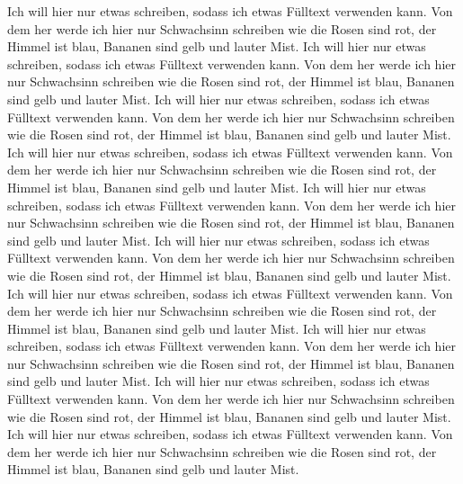 Ich will hier nur etwas schreiben, sodass ich etwas Fülltext verwenden kann. Von dem her werde ich hier nur Schwachsinn schreiben wie die Rosen sind rot, der Himmel ist blau, Bananen sind gelb und lauter Mist. Ich will hier nur etwas schreiben, sodass ich etwas Fülltext verwenden kann. Von dem her werde ich hier nur Schwachsinn schreiben wie die Rosen sind rot, der Himmel ist blau, Bananen sind gelb und lauter Mist. Ich will hier nur etwas schreiben, sodass ich etwas Fülltext verwenden kann. Von dem her werde ich hier nur Schwachsinn schreiben wie die Rosen sind rot, der Himmel ist blau, Bananen sind gelb und lauter Mist. Ich will hier nur etwas schreiben, sodass ich etwas Fülltext verwenden kann. Von dem her werde ich hier nur Schwachsinn schreiben wie die Rosen sind rot, der Himmel ist blau, Bananen sind gelb und lauter Mist. Ich will hier nur etwas schreiben, sodass ich etwas Fülltext verwenden kann. Von dem her werde ich hier nur Schwachsinn schreiben wie die Rosen sind rot, der Himmel ist blau, Bananen sind gelb und lauter Mist. Ich will hier nur etwas schreiben, sodass ich etwas Fülltext verwenden kann. Von dem her werde ich hier nur Schwachsinn schreiben wie die Rosen sind rot, der Himmel ist blau, Bananen sind gelb und lauter Mist. Ich will hier nur etwas schreiben, sodass ich etwas Fülltext verwenden kann. Von dem her werde ich hier nur Schwachsinn schreiben wie die Rosen sind rot, der Himmel ist blau, Bananen sind gelb und lauter Mist. Ich will hier nur etwas schreiben, sodass ich etwas Fülltext verwenden kann. Von dem her werde ich hier nur Schwachsinn schreiben wie die Rosen sind rot, der Himmel ist blau, Bananen sind gelb und lauter Mist. Ich will hier nur etwas schreiben, sodass ich etwas Fülltext verwenden kann. Von dem her werde ich hier nur Schwachsinn schreiben wie die Rosen sind rot, der Himmel ist blau, Bananen sind gelb und lauter Mist. Ich will hier nur etwas schreiben, sodass ich etwas Fülltext verwenden kann. Von dem her werde ich hier nur Schwachsinn schreiben wie die Rosen sind rot, der Himmel ist blau, Bananen sind gelb und lauter Mist. 

